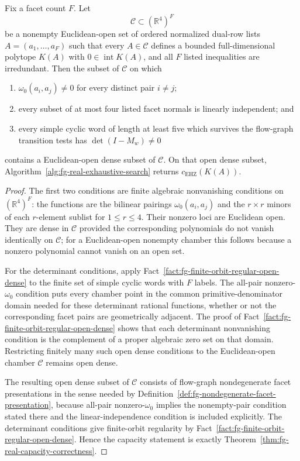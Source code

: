 \begin{unverified}
\begin{proposition}%
\label{prop:fg-presentation-chamber-genericity}
Fix a facet count \(F\).  Let
\[
  \mathcal C\subset(\mathbb R^4)^F
\]
be a nonempty Euclidean-open set of ordered normalized dual-row lists
\(A=(a_1,\ldots,a_F)\) such that every \(A\in\mathcal C\) defines a bounded
full-dimensional polytope \(K(A)\) with \(0\in\operatorname{int}K(A)\), and
all \(F\) listed inequalities are irredundant.  Then the subset of
\(\mathcal C\) on which
\begin{enumerate}
\item \(\omega_0(a_i,a_j)\ne0\) for every distinct pair \(i\ne j\);
\item every subset of at most four listed facet normals is linearly
  independent; and
\item every simple cyclic word of length at least five which survives the
  flow-graph transition tests has \(\det(I-M_w)\ne0\)
\end{enumerate}
contains a Euclidean-open dense subset of \(\mathcal C\).  On that open dense
subset, Algorithm~\ref{alg:fg-real-exhaustive-search} returns
\(c_{\mathrm{EHZ}}(K(A))\).
\end{proposition}

\begin{proof}
The first two conditions are finite algebraic nonvanishing conditions on
\((\mathbb R^4)^F\): the functions are the bilinear pairings
\(\omega_0(a_i,a_j)\) and the \(r\times r\) minors of each \(r\)-element
sublist for \(1\le r\le4\).  Their nonzero loci are Euclidean open.  They are
dense in \(\mathcal C\) provided the corresponding polynomials do not vanish
identically on \(\mathcal C\); for a Euclidean-open nonempty chamber this
follows because a nonzero polynomial cannot vanish on an open set.

For the determinant conditions, apply
Fact~\ref{fact:fg-finite-orbit-regular-open-dense} to the finite set of simple
cyclic words with \(F\) labels.  The all-pair nonzero-\(\omega_0\) condition
puts every chamber point in the common primitive-denominator domain needed for
these determinant rational functions, whether or not the corresponding facet
pairs are geometrically adjacent.  The proof of
Fact~\ref{fact:fg-finite-orbit-regular-open-dense} shows that each determinant
nonvanishing condition is the complement of a proper algebraic zero set on
that domain.  Restricting finitely many such open dense conditions to the
Euclidean-open chamber \(\mathcal C\) remains open dense.

The resulting open dense subset of \(\mathcal C\) consists of flow-graph
nondegenerate facet presentations in the sense needed by
Definition~\ref{def:fg-nondegenerate-facet-presentation}, because all-pair
nonzero-\(\omega_0\) implies the nonempty-pair condition stated there and the
linear-independence condition is included explicitly.  The determinant
conditions give finite-orbit regularity by
Fact~\ref{fact:fg-finite-orbit-regular-open-dense}.  Hence the capacity
statement is exactly Theorem~\ref{thm:fg-real-capacity-correctness}.
\end{proof}
\end{unverified}

